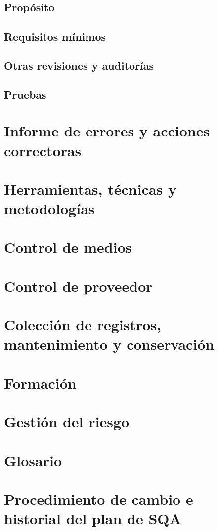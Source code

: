 \documentclass[11pt, a4paper, twoside]{report}
\begin{document}
		\subsection{Propósito}
		\subsection{Requisitos mínimos}
		\subsection{Otras revisiones y auditorías}
		\subsection{Pruebas}
	\section{Informe de errores y acciones correctoras}
	\section{Herramientas, técnicas y metodologías}
	\section{Control de medios}
	\section{Control de proveedor}
	\section{Colección de registros, mantenimiento y conservación}
	\section{Formación}
	\section{Gestión del riesgo}
	\section{Glosario}
		\printglossaries
	\section{Procedimiento de cambio e historial del plan de SQA}


	\newpage
	
	
\end{document}
